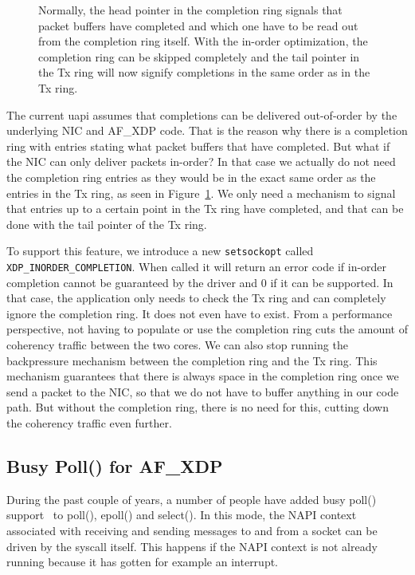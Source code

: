 \documentclass[9pt,numbers,reprint]{sigplanconf}
\begin{document}
\begin{figure}[t]
\resizebox{0.5\textwidth}{!}{}
\caption{Normally, the head pointer in the completion ring signals
  that packet buffers have completed and which one have to be read out
from the completion ring itself. With the in-order optimization, the
completion ring can be skipped completely and the tail pointer in the
Tx ring will now signify completions in the same order as in the Tx ring.}
\label{fig:in_order}
\end{figure}

The current uapi assumes that completions can be delivered
out-of-order by the underlying NIC and AF\_XDP code. That is the reason
why there is a completion ring with entries stating what packet
buffers that have completed. But what if the NIC can only deliver
packets in-order? In that case we actually do not need the completion
ring entries as they would be in the exact same order as the entries
in the Tx ring, as seen in Figure~\ref{fig:in_order}. We only need a
mechanism to signal that entries up to a certain point in the Tx ring
have completed, and that can be done with the tail pointer of the Tx
ring.

To support this feature, we introduce a new {\tt setsockopt} called
{\tt XDP\_INORDER\_COMPLETION}. When called it will return an error
code if in-order completion cannot be guaranteed by the driver and 0
if it can be supported. In that case, the application only needs to
check the Tx ring and can completely ignore the completion ring. It
does not even have to exist. From a performance perspective, not
having to populate or use the completion ring cuts the amount of
coherency traffic between the two cores. We can also stop running the
backpressure mechanism between the completion ring and the Tx
ring. This mechanism guarantees that there is always space in the
completion ring once we send a packet to the NIC, so that we do not
have to buffer anything in our code path. But without the completion
ring, there is no need for this, cutting down the coherency traffic
even further.


\subsection{Busy Poll() for AF\_XDP}

During the past couple of years, a number of people have added busy
poll() support~\cite{busy_poll} to poll(), epoll() and select(). In
this mode, the NAPI context associated with receiving and sending
messages to and from a socket can be driven by the syscall
itself. This happens if the NAPI context is not already running
because it has gotten for example an interrupt.
\end{document}
